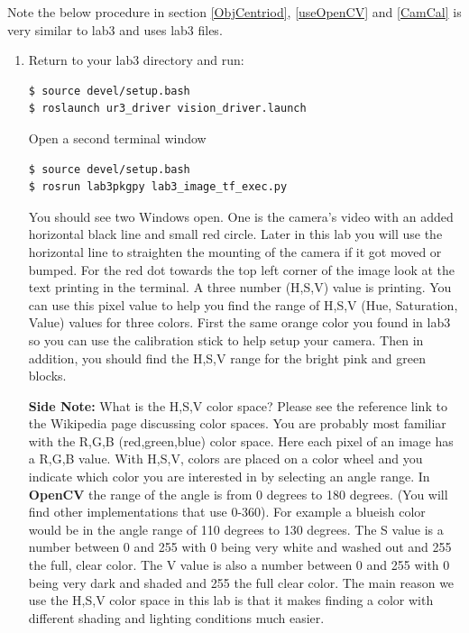 Note the below procedure in section \ref{ObjCentriod}, \ref{useOpenCV} and \ref{CamCal} is very similar to lab3 and uses lab3 files.

\begin{enumerate}
 
\item Return to your lab3 directory and run:

\begin{lstlisting}[language=bash]
$ source devel/setup.bash
$ roslaunch ur3_driver vision_driver.launch
\end{lstlisting}

Open a second terminal window

\begin{lstlisting}[language=bash]
$ source devel/setup.bash
$ rosrun lab3pkgpy lab3_image_tf_exec.py
\end{lstlisting}

You should see two Windows open.  One is the camera’s video with an added horizontal black line and small red circle.  Later in this lab you will use the horizontal line to straighten the mounting of the camera if it got moved or bumped.  For the red dot towards the top left corner of the image look at the text printing in the terminal.  A three number (H,S,V) value is printing.  You can use this pixel value to help you find the range of H,S,V (Hue, Saturation, Value) values for three colors. First the same orange color you found in lab3 so you can use the calibration stick to help setup your camera. Then in addition, you should find the H,S,V range for the bright pink and green blocks.

\textbf{Side Note:}  What is the H,S,V color space?  Please see the reference link to the Wikipedia  page discussing color spaces.  You are probably most familiar with the R,G,B (red,green,blue) color space.  Here each pixel of an image has a R,G,B value.  With H,S,V, colors are placed on a color wheel and you indicate which color you are interested in by selecting an angle range.  In \textbf{OpenCV} the range of the angle is from 0 degrees to 180 degrees.  (You will find other implementations that use 0-360).  For example a blueish color would be in the angle range of 110 degrees to 130 degrees.  The S value is a number between 0 and 255 with 0 being very white and washed out and 255 the full, clear color.  The V value is also a number between 0 and 255 with 0 being very dark and shaded and 255 the full clear color.  The main reason we use the H,S,V color space in this lab is that it makes finding a color with different shading and lighting conditions much easier. 


\end{enumerate}
